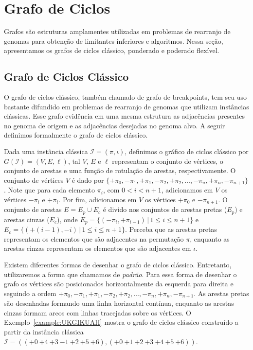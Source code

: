 

\section{Grafo de Ciclos}

Grafos são estruturas amplamentes utilizadas em problemas de rearranjo de genomas para obtenção de limitantes inferiores e algoritmos. Nessa seção, apresentamos os grafos de ciclos clássico, ponderado e poderado flexível.

\subsection{Grafo de Ciclos Clássico}

O grafo de ciclos clássico, também chamado de grafo de breakpoints, tem seu uso bastante difundido em problemas de rearranjo de genomas que utilizam instâncias clássicas. Esse grafo evidência em uma mesma estrutura as adjacências presentes no genoma de origem e as adjacências desejadas no genoma alvo. A seguir definimos formalmente o grafo de ciclos clássico.

Dada uma instância clássica $\mathcal{I} = (\pi,\iota)$, definimos o gráfico de ciclos clássico por $G(\mathcal{I}) = (V, E, \ell)$, tal $V$, $E$ e $\ell$ representam o conjunto de vértices, o conjunto de arestas e uma função de rotulação de arestas, respectivamente. O conjunto de vértices $V$ é dado por $\{{+\pi_0}, {-\pi_1}, {+\pi_1}, {-\pi_2}, {+\pi_2}, \dots, {-\pi_n}, {+\pi_n}, {-\pi_{n+1}}\}$. Note que para cada elemento $\pi_i$, com $0 < i < n+1$, adicionamos em $V$ os vértices ${-\pi_i}$ e ${+\pi_i}$. Por fim, adicionamos em $V$ os vértices ${+\pi_0}$ e ${-\pi_{n+1}}$. O conjunto de arestas $E = E_p \cup E_c$ é divido nos conjuntos de arestas pretas ($E_p$) e arestas cinzas ($E_c$), onde $E_p = \{(-\pi_i, +\pi_{i-1}) \,|\, 1 \leq i \leq n+1\}$ e $E_c = \{(+(i-1), -i) \,|\, 1 \leq i \leq n + 1\}$. Perceba que as arestas pretas representam os elementos que são adjacentes na permutação $\pi$, enquanto as arestas cinzas representam os elementos que são adjacentes em $\iota$.

Existem diferentes formas de desenhar o grafo de ciclos clássico. Entretanto, utilizaremos a forma que chamamos de \emph{padrão}. Para essa forma de desenhar o grafo os vértices são posicionados horizontalmente da esquerda para direita e seguindo a ordem ${+\pi_0}, {-\pi_1}, {+\pi_1}, {-\pi_2}, {+\pi_2}, \dots, {-\pi_n}, {+\pi_n}, {-\pi_{n+1}}$. As arestas pretas são desenhadas formando uma linha horizontal contínua, enquanto as arestas cinzas formam arcos com linhas tracejadas sobre os vértices. O Exemplo~\ref{example:UKGIKUAH} mostra o grafo de ciclos clássico construído a partir da instância clássica $\mathcal{I} = (({+0}~{+4}~{+3}~{-1}~{+2}~{+5}~{+6}),({+0}~{+1}~{+2}~{+3}~{+4}~{+5}~{+6}))$.

